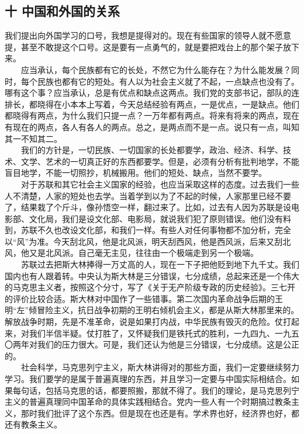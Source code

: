 \documentclass[cn,11pt,chinese]{elegantbook}
\def\myformat#1{\hfil\hfil #1}
\begin{document}
\subsection*{\myformat{十 中国和外国的关系}}
我们提出向外国学习的口号，我想是提得对的。现在有些国家的领导人就不愿意提，甚至不敢提这个口号。这是要有一点勇气的，就是要把戏台上的那个架子放下来。\\
　　应当承认，每个民族都有它的长处，不然它为什么能存在？为什么能发展？同时，每个民族也都有它的短处。有人以为社会主义就了不起，一点缺点也没有了。哪有这个事？应当承认，总是有优点和缺点这两点。我们党的支部书记，部队的连排长，都晓得在小本本上写着，今天总结经验有两点，一是优点，一是缺点。他们都晓得有两点，为什么我们只提一点？一万年都有两点。将来有将来的两点，现在有现在的两点，各人有各人的两点。总之，是两点而不是一点。说只有一点，叫知其一不知其二。\\
　　我们的方针是，一切民族、一切国家的长处都要学，政治、经济、科学、技术、文学、艺术的一切真正好的东西都要学。但是，必须有分析有批判地学，不能盲目地学，不能一切照抄，机械搬用。他们的短处、缺点，当然不要学。\\
　　对于苏联和其它社会主义国家的经验，也应当采取这样的态度。过去我们一些人不清楚，人家的短处也去学。当着学到以为了不起的时候，人家那里已经不要了，结果栽了个斤斗，像孙悟空一样，翻过来了。比如，过去有人因为苏联是设电影部、文化局，我们是设文化部、电影局，就说我们犯了原则错误。他们没有料到，苏联不久也改设文化部，和我们一样。有些人对任何事物都不加分析，完全以“风”为准。今天刮北风，他是北风派，明天刮西风，他是西风派，后来又刮北风，他又是北风派。自己毫无主见，往往由一个极端走到另一个极端。\\
　　苏联过去把斯大林捧得一万丈高的人，现在一下子把他贬到地下九千丈。我们国内也有人跟着转。中央认为斯大林是三分错误，七分成绩，总起来还是一个伟大的马克思主义者，按照这个分寸，写了《关于无产阶级专政的历史经验》。三七开的评价比较合适。斯大林对中国作了一些错事。第二次国内革命战争后期的王明“左”倾冒险主义，抗日战争初期的王明右倾机会主义，都是从斯大林那里来的。解放战争时期，先是不准革命，说是如果打内战，中华民族有毁灭的危险。仗打起来，对我们半信半疑。仗打胜了，又怀疑我们是铁托式的胜利，一九四九、一九五〇两年对我们的压力很大。可是，我们还认为他是三分错误，七分成绩。这是公正的。\\
　　社会科学，马克思列宁主义，斯大林讲得对的那些方面，我们一定要继续努力学习。我们要学的是属于普遍真理的东西，并且学习一定要与中国实际相结合。如果每句话，包括马克思的话，都要照搬，那就不得了。我们的理论，是马克思列宁主义的普遍真理同中国革命的具体实践相结合。党内一些人有一个时期搞过教条主义，那时我们批评了这个东西。但是现在也还是有。学术界也好，经济界也好，都还有教条主义。\\
\end{document}
